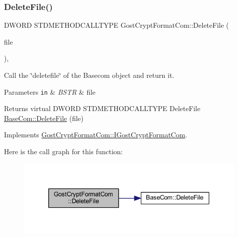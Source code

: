 \subsubsection{\texorpdfstring{Delete\+File()}{DeleteFile()}}
{\footnotesize\ttfamily D\+W\+O\+RD S\+T\+D\+M\+E\+T\+H\+O\+D\+C\+A\+L\+L\+T\+Y\+PE Gost\+Crypt\+Format\+Com\+::\+Delete\+File (\begin{DoxyParamCaption}\item[{B\+S\+TR}]{file }\end{DoxyParamCaption})\hspace{0.3cm}{\ttfamily [inline]}, {\ttfamily [virtual]}}



Call the \char`\"{}deletefile\char`\"{} of the Basecom object and return it. 


\begin{DoxyParams}[1]{Parameters}
\mbox{\tt in}  & {\em B\+S\+TR} & file \\
\hline
\end{DoxyParams}
\begin{DoxyReturn}{Returns}
virtual D\+W\+O\+RD S\+T\+D\+M\+E\+T\+H\+O\+D\+C\+A\+L\+L\+T\+Y\+PE Delete\+File \hyperlink{class_base_com_a52133219ed5ad54607a6c417de0ba666}{Base\+Com\+::\+Delete\+File} (file) 
\end{DoxyReturn}


Implements \hyperlink{interface_gost_crypt_format_com_1_1_i_gost_crypt_format_com}{Gost\+Crypt\+Format\+Com\+::\+I\+Gost\+Crypt\+Format\+Com}.

Here is the call graph for this function\+:
\nopagebreak
\begin{figure}[H]
\begin{center}
\leavevmode
\includegraphics[width=337pt]{class_gost_crypt_format_com_a5b810b716c3cc5991fdce0f888bdef0f_cgraph}
\end{center}
\end{figure}
\mbox{\label{class_gost_crypt_format_com_ac727a2357f7e489cda8141458277946c}} 
